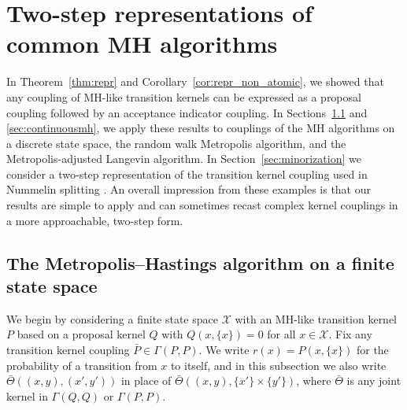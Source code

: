 \documentclass[aihp]{imsart}
\theoremstyle{plain}
\theoremstyle{remark}
\theoremstyle{definition} \newtheorem{example}{Example}
\newcommand{\calX}{\mathcal{X}}
\newcommand{\bp}{\bar P}
\newcommand{\sx}{\{ x \}}
\newcommand{\xy}{(x,y)}
\newcommand{\xyp}{(x',y')}
\begin{document}

\section{Two-step representations of common MH algorithms}
\label{sec:appn}

In Theorem~\ref{thm:repr} and Corollary~\ref{cor:repr_non_atomic}, we showed that any coupling of
MH-like transition kernels can be expressed as a proposal coupling followed by an acceptance
indicator coupling. In Sections~\ref{sec:discrete} and \ref{sec:continuousmh}, we apply these
results to couplings of the MH algorithms on a discrete state space, the random walk Metropolis
algorithm, and the Metropolis-adjusted Langevin algorithm. In Section~\ref{sec:minorization} we
consider a two-step representation of the transition kernel coupling used in Nummelin splitting
\citep{rosenthal1995minorization, jones2001honest}. An overall impression from these examples is
that our results are simple to apply and can sometimes recast complex kernel couplings in
a more approachable, two-step form.

\subsection{The Metropolis--Hastings algorithm on a finite state space}
\label{sec:discrete}

We begin by considering a finite state space $\calX$ with an MH-like transition kernel $P$ based on
a proposal kernel $Q$ with ${Q(x, \sx) = 0}$ for all $x \in \calX$. Fix any transition kernel
coupling ${\bp \in \Gamma(P, P)}$. We write $r(x) = P(x,\sx)$ for the probability of a transition
from $x$ to itself, and in this subsection we also write $\bar \Theta(\xy, \xyp)$ in place of ${\bar
	\Theta(\xy, \{x'\} \times \{y' \})}$, where $\bar \Theta$ is any joint kernel in $\Gamma(Q,Q)$ or
$\Gamma(P,P)$.
\end{document}
